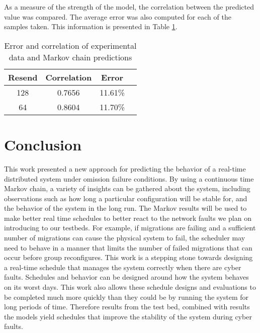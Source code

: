 As a measure of the strength of the model, the correlation between the predicted value was compared.
The average error was also computed for each of the samples taken. This information is presented in
Table \ref{tab:STAT-DATA}.

\begin{table}
\caption{Error and correlation of experimental data and Markov chain predictions}
\label{tab:STAT-DATA}
\centering
\begin{tabular}{|c||c|c|c|} 
\hline
Resend & Correlation & Error \\ \hline
128 & 0.7656 & 11.61\% \\ \hline
64 & 0.8604 & 11.70\% \\ \hline 
\end{tabular}
\end{table}

\section{Conclusion}

This work presented a new approach for predicting the behavior of a real-time
distributed system under omission failure conditions. By using a continuous time
Markov chain, a variety of insights can be gathered about the system, including
observations such as how long a particular configuration will be stable for, 
and the behavior of the system in the long run.  The Markov results will be used
 to make better real time schedules to better react to the network faults we
plan on introducing to our testbeds. For example, if migrations are failing
and a sufficient number of migrations can cause the physical system to fail,
the scheduler may need to behave in a manner that limits the number of failed
migrations that can occur before group reconfigures. This work is a stepping
stone towards designing a real-time schedule that manages the system correctly
when there are cyber faults. Schedules and behavior can be designed around how
the system behaves on its worst days. This work also allows these schedule designs
and evaluations to be completed much more quickly than they could be by running
the system for long periods of time. Therefore results from the test bed, combined
with results the models yield schedules that improve the stability of the
system during cyber faults.




